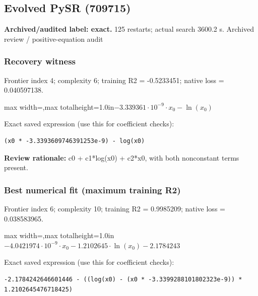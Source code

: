 \documentclass[10pt,letterpaper,landscape]{article}
\begin{document}
\begin{minipage}[t]{0.485\textwidth}
\subsection*{Evolved PySR (709715)}
\textbf{Archived/audited label: exact.} 125 restarts; actual search 3600.2 s.
{\small Archived review / positive-equation audit}
\subsubsection*{Recovery witness}
Frontier index 4; complexity 6; training R2 = -0.5233451; native loss = 0.040597138.
\begin{center}\begin{adjustbox}{max width=\linewidth,max totalheight=1.0in}$\displaystyle - 3.339361 \cdot 10^{-9} \cdot x_{0} - \ln{\left(x_{0} \right)}$\end{adjustbox}\end{center}
{\scriptsize Exact saved expression (use this for coefficient checks):}
\begin{lstlisting}
(x0 * -3.3393609746391253e-9) - log(x0)
\end{lstlisting}
{\small\textbf{Review rationale:} c0 + c1*log(x0) + c2*x0, with both nonconstant terms present.}
\subsubsection*{Best numerical fit (maximum training R2)}
Frontier index 6; complexity 10; training R2 = 0.9985209; native loss = 0.038583965.
\begin{center}\begin{adjustbox}{max width=\linewidth,max totalheight=1.0in}$\displaystyle - 4.0421974 \cdot 10^{-9} \cdot x_{0} - 1.2102645 \cdot \ln{\left(x_{0} \right)} - 2.1784243$\end{adjustbox}\end{center}
{\scriptsize Exact saved expression (use this for coefficient checks):}
\begin{lstlisting}
-2.1784242646601446 - ((log(x0) - (x0 * -3.3399288101802323e-9)) * 1.2102645476718425)
\end{lstlisting}
\end{minipage}
\clearpage{}\label{schechter-10001}
\end{document}
